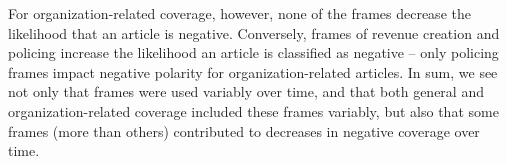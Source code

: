 For organization-related coverage, however, none of the frames decrease the likelihood that an article is negative. Conversely, frames of revenue creation and policing increase the likelihood an article is classified as negative -- only policing frames impact negative polarity for organization-related articles. In sum, we see not only that frames were used variably over time, and that both general and organization-related coverage included these frames variably, but also that some frames (more than others) contributed to decreases in negative coverage over time. 






%


%


%


%

